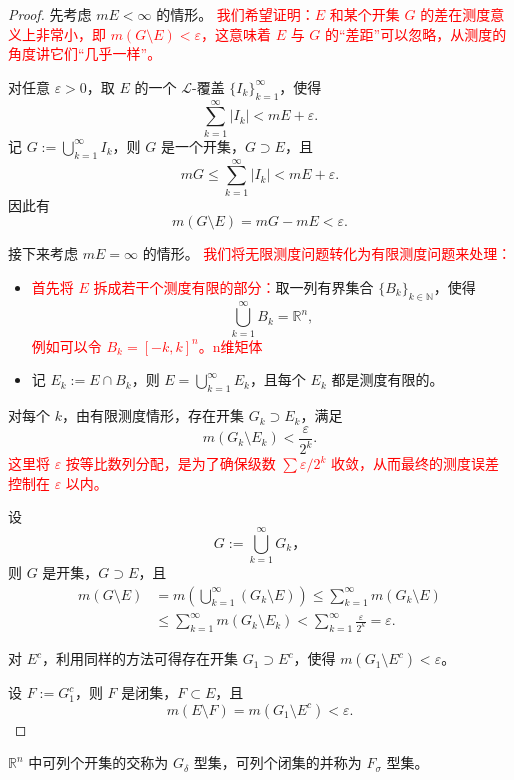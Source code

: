 \documentclass[lang=cn,10pt]{elegantbook}
\begin{document}
\begin{proof}
先考虑 $mE < \infty$ 的情形。
\textcolor{red}{我们希望证明：$E$ 和某个开集 $G$ 的差在测度意义上非常小，即 $m(G \setminus E) < \varepsilon$，这意味着 $E$ 与 $G$ 的“差距”可以忽略，从测度的角度讲它们“几乎一样”。}

对任意 $\varepsilon > 0$，取 $E$ 的一个 $\mathcal{L}$-覆盖 $\{I_k\}_{k=1}^\infty$，使得
\[
\sum_{k=1}^\infty |I_k| < mE + \varepsilon.
\]
记 $G := \bigcup_{k=1}^\infty I_k$，则 $G$ 是一个开集，$G \supset E$，且
\[
mG \leq \sum_{k=1}^\infty |I_k| < mE + \varepsilon.
\]
因此有
\[
m(G \setminus E) = mG - mE < \varepsilon.
\]

\vspace{1em}
接下来考虑 $mE = \infty$ 的情形。
\textcolor{red}{我们将无限测度问题转化为有限测度问题来处理：}

\begin{itemize}
  \item 
  \textcolor{red}{首先将 $E$ 拆成若干个测度有限的部分：}取一列有界集合 $\{B_k\}_{k \in \mathbb{N}}$，使得
  \[
  \bigcup_{k=1}^\infty B_k = \mathbb{R}^n,
  \]
  \textcolor{red}{例如可以令 $B_k = [-k, k]^n$。n维矩体}
  
  \item 记 $E_k := E \cap B_k$，则 $E = \bigcup_{k=1}^\infty E_k$，且每个 $E_k$ 都是测度有限的。
\end{itemize}

对每个 $k$，由有限测度情形，存在开集 $G_k \supset E_k$，满足
\[
m(G_k \setminus E_k) < \frac{\varepsilon}{2^k}.
\]
\textcolor{red}{这里将 $\varepsilon$ 按等比数列分配，是为了确保级数 $\sum \varepsilon/2^k$ 收敛，从而最终的测度误差控制在 $\varepsilon$ 以内。}

设
\[
G := \bigcup_{k=1}^\infty G_k，
\]
则 $G$ 是开集，$G \supset E$，且
\[
\begin{aligned}
m(G \setminus E)
&= m\left( \bigcup_{k=1}^\infty (G_k \setminus E) \right)
\leq \sum_{k=1}^\infty m(G_k \setminus E) \\
&\leq \sum_{k=1}^\infty m(G_k \setminus E_k)
< \sum_{k=1}^\infty \frac{\varepsilon}{2^k} = \varepsilon.
\end{aligned}
\]

对 $E^c$，利用同样的方法可得存在开集 $G_1 \supset E^c$，使得 $m(G_1 \setminus E^c) < \varepsilon$。

设 $F := G_1^c$，则 $F$ 是闭集，$F \subset E$，且
\[
m(E \setminus F) = m(G_1 \setminus E^c) < \varepsilon.
\]
\end{proof}
\begin{definition}
$\mathbb{R}^n$ 中可列个开集的交称为 $G_\delta$ 型集，可列个闭集的并称为 $F_\sigma$ 型集。
\end{definition}
\end{document}
